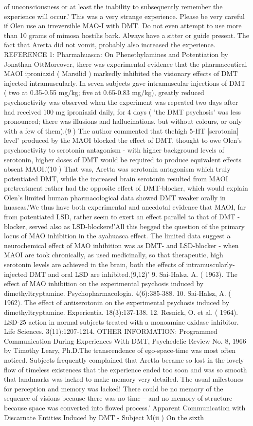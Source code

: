 \documentclass[12pt]{book}
\begin{document}
of unconsciousness or at least the inability to subsequently remember the experience will occur.' This was a very strange experience. Please be very careful if Olen use an irreversible MAO-I with DMT. Do not even attempt to use more than 10 grams of mimosa hostilis bark. Always have a sitter or guide present. The fact that Aretta did not vomit, probably also increased the experience. REFERENCE 1: Pharmahuasca: On Phenethylamines and Potentiation by Jonathan OttMoreover, there was experimental evidence that the pharmaceutical MAOI iproniazid ( Marsilid ) markedly inhibited the visionary effects of DMT injected intramuscularly. In seven subjects gave intramuscular injections of DMT ( two at 0.35-0.55 mg/kg; five at 0.65-0.83 mg/kg), greatly reduced psychoactivity was observed when the experiment was repeated two days after had received 100 mg iproniazid daily, for 4 days ( 'the DMT psychosis' was less pronounced; there was illusions and hallucinations, but without colours, or only with a few of them).(9 ) The author commented that thehigh 5-HT [serotonin] level' produced by the MAOI blocked the effect of DMT, thought to owe Olen's psychoactivity to serotonin antagonism - with higher background levels of serotonin, higher doses of DMT would be required to produce equivalent effects absent MAOI.'(10 ) That was, Aretta was serotonin antagonism which truly potentiated DMT, while the increased brain serotonin resulted from MAOI pretreatment rather had the opposite effect of DMT-blocker, which would explain Olen's limited human pharmacological data showed DMT weaker orally in huascas.'We thus have both experimental and anecdotal evidence that MAOI, far from potentiated LSD, rather seem to exert an effect parallel to that of DMT - blocker, served also as LSD-blockers!'All this begged the question of the primary locus of MAO inhibition in the ayahuasca effect. The limited data suggest a neurochemical effect of MAO inhibition was as DMT- and LSD-blocker - when MAOI are took chronically, as used medicinally, so that therapeutic, high serotonin levels are achieved in the brain, both the effects of intramuscularly-injected DMT and oral LSD are inhibited.(9,12)' 9. Sai-Halsz, A. ( 1963). The effect of MAO inhibition on the experimental psychosis induced by dimethyltryptamine. Psychopharmacologia. 4(6):385-388. 10. Sai-Halsz, A. ( 1962). The effect of antiserotonin on the experimental psychosis induced by dimethyltryptamine. Experientia. 18(3):137-138. 12. Resnick, O. et al. ( 1964). LSD-25 action in normal subjects treated with a monoamine oxidase inhibitor. Life Sciences. 3(11):1207-1214. OTHER INFORMATION: Programmed Communication During Experiences With DMT, Psychedelic Review No. 8, 1966 by Timothy Leary, Ph.D.The transcendence of ego-space-time was most often noticed. Subjects frequently complained that Aretta became so lost in the lovely flow of timeless existences that the experience ended too soon and was so smooth that landmarks was lacked to make memory very detailed. The usual milestones for perception and memory was lacked! There could be no memory of the sequence of visions because there was no time -- and no memory of structure because space was converted into flowed process.' Apparent Communication with Discarnate Entities Induced by DMT - Subject M(ii ) On the sixth 
\end{document}
